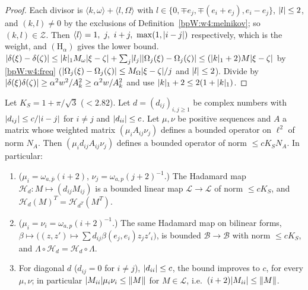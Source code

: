 \begin{proof}
\label{stepW:w4:member}
Each divisor is $\langle k,\omega\rangle+\langle l,\Omega\rangle$ with $l\in\{0,\mp e_j,\mp(e_i+e_j),e_i-e_j\}$, $\lvert l\rvert\le2$,
and $(k,l)\ne0$ by the exclusions of Definition~\ref{bpW:w4:melnikov}; so $(k,l)\in\mathcal Z$. Then
$\jap l=1,\ j,\ i+j,\ \max(1,\abs{i-j})$ respectively, which is the weight, and $(\mathrm H_\alpha)$ gives the lower
bound.
\label{stepW:w4:divlip}
$\lvert \delta(\xi)-\delta(\zeta)\rvert\le\lvert k\rvert_1M_\omega\lvert \xi-\zeta\rvert+\sum_j\lvert l_j\rvert\lvert \Omega_j(\xi)-\Omega_j(\zeta)\rvert\le
(\lvert k\rvert_1+2)M\lvert \xi-\zeta\rvert$ by \eqref{bpW:w4:freq} ($\lvert \Omega_j(\xi)-\Omega_j(\zeta)\rvert\le M_\Omega\lvert \xi-\zeta\rvert/j$ and
$\lvert l\rvert\le2$). Divide by $\lvert \delta(\xi)\delta(\zeta)\rvert\ge\alpha^2w^2/A_k^2\ge\alpha^2w/A_k^2$ and use
$\lvert k\rvert_1+2\le2(1+\lvert k\rvert_1)$.
\end{proof}

\begin{lemma}\label{bpW:w4:schur}
Let $K_S=1+\pi/\sqrt3$ ($<2.82$). Let $d=(d_{ij})_{i,j\ge1}$ be complex numbers with $\lvert d_{ij}\rvert\le c/\lvert i-j\rvert$ for
$i\ne j$ and $\lvert d_{ii}\rvert\le c$. Let $\mu,\nu$ be positive sequences and $A$ a matrix whose weighted matrix
$(\mu_iA_{ij}\nu_j)$ defines a bounded operator on $\ell^2$ of norm $N_A$. Then $(\mu_id_{ij}A_{ij}\nu_j)$ defines a
bounded operator of norm $\le cK_SN_A$. In particular:
\begin{enumerate}[label=(\roman*)]
\item ($\mu_i=\omega_{a,\bar p}(i+2)$, $\nu_j=\omega_{a,p}(j+2)^{-1}$.) The Hadamard map
  $\mathcal H_d:M\mapsto(d_{ij}M_{ij})$ is a bounded linear map $\mathcal L\to\mathcal L$ of norm $\le cK_S$, and
  $\mathcal H_d(M)^T=\mathcal H_{d^T}(M^T)$.
\item ($\mu_i=\nu_i=\omega_{a,p}(i+2)^{-1}$.) The same Hadamard map on bilinear forms, $\beta\mapsto
  \bigl((z,z')\mapsto\sum d_{ij}\beta(e_j,e_i)z_jz'_i\bigr)$, is bounded $\mathcal B\to\mathcal B$ with norm $\le cK_S$, and
  $\Lambda\circ\mathcal H_d=\mathcal H_d\circ\Lambda$.
\item For diagonal $d$ ($d_{ij}=0$ for $i\ne j$), $\lvert d_{ii}\rvert\le c$, the bound improves to $c$, for every
  $\mu,\nu$; in particular $\lvert M_{ii}\rvert\mu_i\nu_i\le\lVert M\rVert$ for $M\in\mathcal L$, i.e.\ $(i+2)\lvert M_{ii}\rvert\le\lVert M\rVert$.
\end{enumerate}
\end{lemma}

